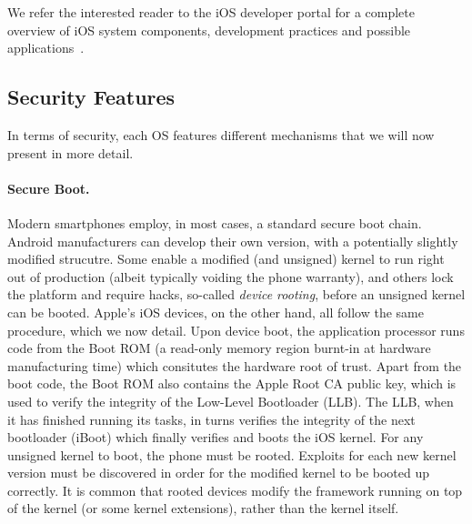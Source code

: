 
We refer the interested reader to the iOS developer portal for a complete overview of iOS system components, development practices and possible applications~\cite{iosdevelopment}.

\subsection{Security Features}

In terms of security, each OS features different mechanisms that we will now present in more detail.

\paragraph{Secure Boot.} Modern smartphones employ, in most cases, a standard
secure boot chain. Android manufacturers can develop their own version, with a
potentially slightly modified strucutre. Some enable a modified (and unsigned)
kernel to run right out of production (albeit typically voiding the phone
warranty), and others lock the platform and require hacks, so-called
\emph{device rooting}, before an unsigned kernel can be booted. Apple's iOS
devices, on the other hand, all follow the same procedure, which we now detail.
Upon device boot, the application processor runs code from the Boot ROM (a
read-only memory region burnt-in at hardware manufacturing time) which
consitutes the hardware root of trust. Apart from the boot code, the Boot ROM
also contains the Apple Root CA public key, which is used to verify the
integrity of the Low-Level Bootloader (LLB). The LLB, when it has finished
running its tasks, in turns verifies the integrity of the next bootloader
(iBoot) which finally verifies and boots the iOS kernel. For any unsigned
kernel to boot, the phone must be rooted. Exploits for each new kernel
version must be discovered in order for the modified kernel to be booted up
correctly. It is common that rooted devices modify the framework running on top
of the kernel (or some kernel extensions), rather than the kernel itself.

